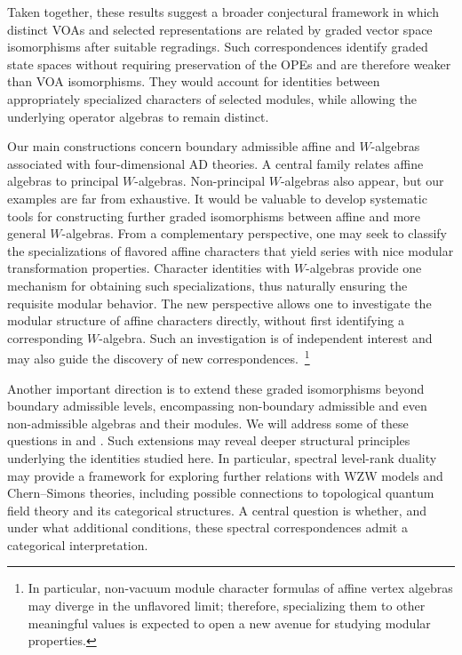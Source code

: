 \documentclass[a4paper,11pt]{article}
\theoremstyle{definition}
\theoremstyle{definition}
\theoremstyle{remark}
\begin{document}
Taken together, these results suggest a broader conjectural framework in which distinct VOAs and selected representations are related by graded vector space isomorphisms after suitable regradings. Such correspondences identify graded state spaces without requiring preservation of the OPEs and are therefore weaker than VOA isomorphisms. They would account for identities between appropriately specialized characters of selected modules, while allowing the underlying operator algebras to remain distinct.

Our main constructions concern boundary admissible affine and $W$-algebras associated with four-dimensional AD theories. A central family relates affine algebras to principal $W$-algebras. Non-principal $W$-algebras also appear, but our examples are far from exhaustive. It would be valuable to develop systematic tools for constructing further graded isomorphisms between affine and more general $W$-algebras. From a complementary perspective, one may seek to classify the specializations of flavored affine characters that yield series with nice modular transformation properties. Character identities with $W$-algebras  provide one mechanism for obtaining such specializations, thus naturally ensuring the requisite modular behavior. The new  perspective allows one to investigate the modular structure of affine characters directly, without first identifying a corresponding $W$-algebra. Such an investigation is of independent interest and may also guide the discovery of new correspondences.~\footnote{In particular, non-vacuum module character formulas of affine vertex algebras may diverge in the unflavored limit; therefore, specializing them to other meaningful values is expected to open a new avenue for studying modular properties.}

Another important direction is to extend these graded isomorphisms beyond boundary admissible levels, encompassing non-boundary admissible and even non-admissible algebras and their modules. We will address some of these questions in \cite{Jiang20272} and \cite{Jiang2027}. Such extensions may reveal deeper structural principles underlying the identities studied here. In particular, spectral level-rank duality may provide a framework for exploring further relations with WZW models and Chern--Simons theories, including possible connections to topological quantum field theory and its categorical structures. A central question is whether, and under what additional conditions, these spectral correspondences admit a categorical interpretation.
\end{document}
